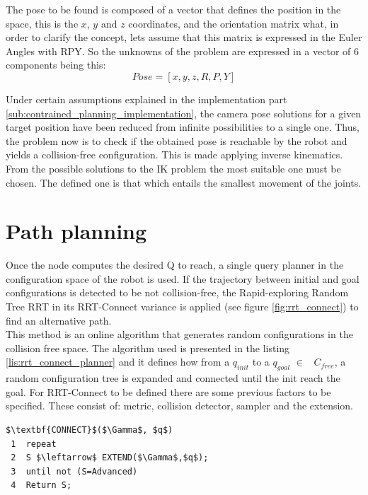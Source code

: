 The pose to be found is composed of a vector that defines the position in the space, this is the $x$, $y$ and $z$ coordinates, and the orientation matrix what, in order to clarify the concept, lets assume that this matrix is expressed in the Euler Angles with RPY. So the unknowns of the problem are expressed in a vector of 6 components being this:
	\begin{equation}
	\label{eq:pose_cartesian_coordinates}
		Pose = [x,y,z,R,P,Y]
	\end{equation}

Under certain assumptions explained in the implementation part \ref{sub:contrained_planning_implementation}, the camera pose solutions for a given target position have been reduced from infinite possibilities to a single one. 
Thus, the problem now is to check if the obtained pose is reachable by the robot and yields a collision-free configuration. 
This is made applying inverse kinematics. 
From the possible solutions to the IK problem the most suitable one must be chosen.
The defined one is that which entails the smallest movement of the joints.

\section{Path planning} %
\label{sec:path_planning}
Once the node computes the desired Q to reach, a single query planner in the configuration space of the robot is used. If the trajectory between initial and goal configurations is detected to be not collision-free, the Rapid-exploring Random Tree RRT in its RRT-Connect variance \cite{RRTConnect} is applied (see figure \ref{fig:rrt_connect}) to find an alternative path.\\

This method is an online algorithm that generates random configurations in the collision free space.
The algorithm used is presented in the listing \ref{lis:rrt_connect_planner} and it defines how from a $q_{init}$ to a $q_{goal}$ $\in$ \ $C_{free}$, a random configuration tree is expanded and connected  until the init reach the goal. For RRT-Connect to be defined there are some previous factors to be specified. These consist of: metric, collision detector, sampler and the extension.

\begin{lstlisting}[frame=tb, mathescape=true, xleftmargin=.28\textwidth, xrightmargin=.28\textwidth,caption=RRT-Connect Algorithm, label=lis:rrt_connect_planner]
$\textbf{CONNECT}$($\Gamma$, $q$)
 1  repeat 
 2  S $\leftarrow$ EXTEND($\Gamma$,$q$);
 3  until not (S=Advanced)
 4  Return S;
\end{lstlisting}
\lstset{}

